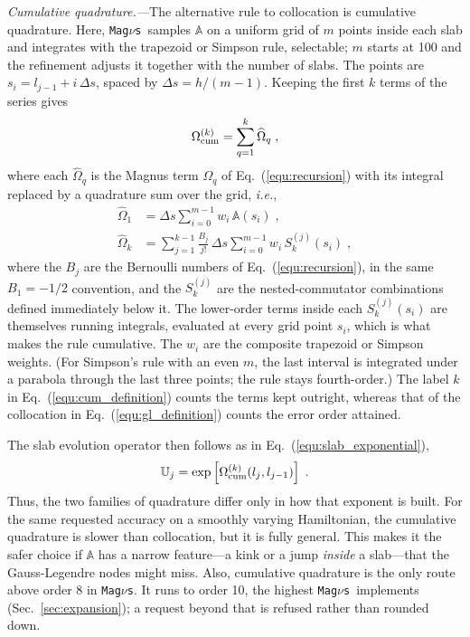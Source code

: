 \documentclass[final,5p,times,twocolumn,sort,compress]{elsarticle}
\makeatletter
\newcommand{\ie}{{\it i.e.}}
\newcommand{\eq}{Eq.}
\DeclareRobustCommand{\_}{%
  \ifmmode\nfss@text{\textunderscore}\else\textunderscore\allowbreak\fi}
\newcommand{\equ}[1]{\eq~(\ref{equ:#1})}
\newcommand{\magnus}{{\tt Mag}\ensuremath{\nu}{\tt s}}
\makeatother
\begin{document}

\smallskip

\textit{Cumulative quadrature.---}The alternative rule to collocation is cumulative quadrature. Here, \magnus\ samples $\mathbb{A}$ on a uniform grid of $m$ points inside each slab and integrates with the trapezoid or Simpson rule, selectable; $m$ starts at 100 and the refinement adjusts it together with the number of slabs. The points are $s_i = l_{j-1} + i\,\Delta s$, spaced by $\Delta s = h/(m-1)$. Keeping the first $k$ terms of the series gives
\begin{equation}
 \label{equ:cum_definition}
 \Omega_{\rm cum}^{(k)}
 =
 \sum_{q=1}^{k} \widehat{\Omega}_q \;,
\end{equation}
where each $\widehat{\Omega}_q$ is the Magnus term $\Omega_q$ of \equ{recursion} with its integral replaced by a quadrature sum over the grid, \ie,
\begin{align}
 \label{equ:cum_weights}
 \widehat{\Omega}_1 &= \Delta s \sum_{i=0}^{m-1} w_i\, \mathbb{A}(s_i) \;, \nonumber \\
 \widehat{\Omega}_k &= \sum_{j=1}^{k-1} \frac{B_j}{j!}\, \Delta s \sum_{i=0}^{m-1} w_i\, S_k^{(j)}(s_i) \;,
\end{align}
where the $B_j$ are the Bernoulli numbers of \equ{recursion}, in the same $B_1 = -1/2$ convention, and the $S_k^{(j)}$ are the nested-commutator combinations defined immediately below it. The lower-order terms inside each $S_k^{(j)}(s_i)$ are themselves running integrals, evaluated at every grid point $s_i$, which is what makes the rule cumulative. The $w_i$ are the composite trapezoid or Simpson weights. (For Simpson's rule with an even $m$, the last interval is integrated under a parabola through the last three points; the rule stays fourth-order.) The label $k$ in \equ{cum_definition} counts the terms kept outright, whereas that of the collocation in \equ{gl_definition} counts the error order attained.

The slab evolution operator then follows as in \equ{slab_exponential},
\begin{equation}
 \label{equ:slab_exponential_cum}
 \mathbb{U}_j = \exp\left[\Omega_{\rm cum}^{(k)}(l_j, l_{j-1})\right] \;.
\end{equation}
Thus, the two families of quadrature differ only in how that exponent is built. For the same requested accuracy on a smoothly varying Hamiltonian, the cumulative quadrature is slower than collocation, but it is fully general. This makes it the safer choice if $\mathbb{A}$ has a narrow feature---a kink or a jump \emph{inside} a slab---that the Gauss-Legendre nodes might miss. Also, cumulative quadrature is the only route above order 8 in \magnus. It runs to order 10, the highest \magnus\ implements (Sec.~\ref{sec:expansion}); a request beyond that is refused rather than rounded down.
\end{document}
